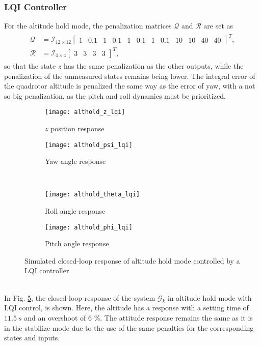 \subsubsection{LQI Controller}
For the altitude hold mode, the penalization matrices $\mathcal{Q}$ and $\mathcal{R}$ are set as
\begin{align}
\label{eqn:QR_althold}
\begin{split}
\mathcal{Q} & = \mathcal{I}_{12 \times 12}\begin{bmatrix}
1 & 0.1 & 1 & 0.1 & 1 & 0.1 & 1 & 0.1 & 10 & 10 & 40 & 40
\end{bmatrix}^{T},\\
\mathcal{R} & = \mathcal{I}_{4 \times 4}\begin{bmatrix}
3 & 3 & 3 & 3
\end{bmatrix}^{T},
\end{split}
\end{align}
so that the state $z$ has the same penalization as the other outputs, while the penalization of the unmeasured states remains being lower. The integral error of the quadrotor altitude is penalized the same way as the error of yaw, with a not so big penalization, as the pitch and roll dynamics must be prioritized.
\begin{figure}[h]
\begin{subfigure}{.5\linewidth}
\centering
\texttt{[image: althold\_z\_lqi]}
\caption{$z$ position response}
\label{fig:althold_z_lqi}
\end{subfigure}%
\begin{subfigure}{.5\linewidth}
\centering
\texttt{[image: althold\_psi\_lqi]}
\caption{Yaw angle response}
\label{fig:althold_psi_lqi}
\end{subfigure}\\[1ex]
\begin{subfigure}{0.5\linewidth}
\centering
\texttt{[image: althold\_theta\_lqi]}
\caption{Roll angle response}
\label{fig:althold_theta_lqi}
\end{subfigure}
\begin{subfigure}{0.5\linewidth}
\centering
\texttt{[image: althold\_phi\_lqi]}
\caption{Pitch angle response}
\label{fig:althold_phi_lqi}
\end{subfigure}
\caption{Simulated closed-loop response of altitude hold mode controlled by a LQI controller}
\label{fig:althold_lqi}
\end{figure}
\\
In Fig. \ref{fig:althold_lqi}, the closed-loop response of the system $\mathcal{G}_k$ in altitude hold mode with LQI control, is shown. Here, the altitude has a response with a setting time of $11.5\ s$ and an overshoot of $6$ \%. The attitude response remains the same as it is in the stabilize mode due to the use of the same penalties for the corresponding states and inputs. 

